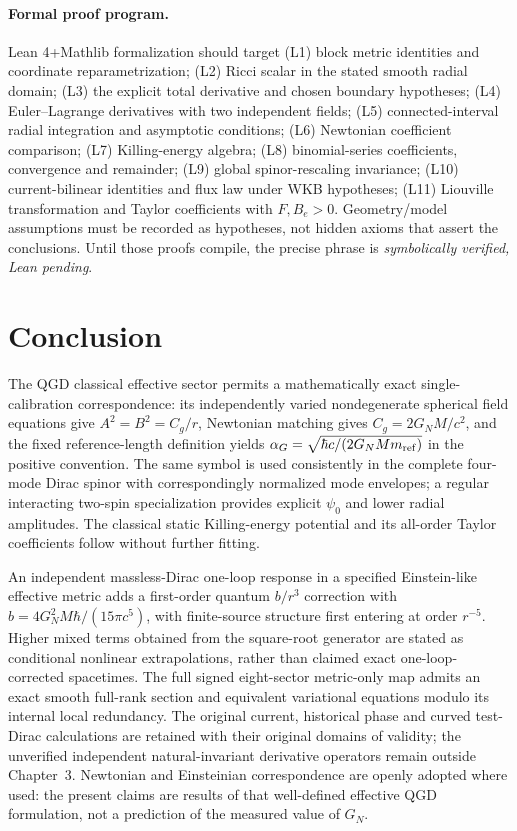 \documentclass[11pt,a4paper]{article}
\theoremstyle{remark}
\begin{document}
\paragraph{Formal proof program.}
Lean 4+Mathlib formalization should target (L1) block metric identities and coordinate reparametrization; (L2) Ricci scalar in the stated smooth radial domain; (L3) the explicit total derivative and chosen boundary hypotheses; (L4) Euler--Lagrange derivatives with two independent fields; (L5) connected-interval radial integration and asymptotic conditions; (L6) Newtonian coefficient comparison; (L7) Killing-energy algebra; (L8) binomial-series coefficients, convergence and remainder; (L9) global spinor-rescaling invariance; (L10) current-bilinear identities and flux law under WKB hypotheses; (L11) Liouville transformation and Taylor coefficients with $F,B_e>0$. Geometry/model assumptions must be recorded as hypotheses, not hidden axioms that assert the conclusions. Until those proofs compile, the precise phrase is \emph{symbolically verified, Lean pending}.

\section{Conclusion}\label{sec:conclusion}
The QGD classical effective sector permits a mathematically exact
single-calibration correspondence: its independently varied nondegenerate
spherical field equations give $A^2=B^2=C_g/r$, Newtonian matching gives
$C_g=2G_NM/c^2$, and the fixed reference-length definition yields
$\alpha_G=\sqrt{\hbar c/(2G_NMm_{\rm ref})}$ in the positive convention.
The same symbol is used consistently in the complete four-mode Dirac
spinor with correspondingly normalized mode envelopes; a regular
interacting two-spin specialization provides explicit $\psi_0$ and lower
radial amplitudes. The classical static Killing-energy potential and
its all-order Taylor coefficients follow without further fitting.

An independent massless-Dirac one-loop response in a specified Einstein-like
effective metric adds a first-order quantum $b/r^3$ correction with
$b=4G_N^2M\hbar/(15\pi c^5)$, with finite-source structure first entering
at order $r^{-5}$. Higher mixed terms obtained from the square-root
generator are stated as conditional nonlinear extrapolations, rather
than claimed exact one-loop-corrected spacetimes. The full signed eight-sector
metric-only map admits an exact smooth full-rank section and equivalent
variational equations modulo its internal local redundancy.
The original current, historical phase and curved test-Dirac calculations
are retained with their original domains of validity; the unverified
independent natural-invariant derivative operators remain outside
Chapter~3. Newtonian and Einsteinian correspondence are openly adopted
where used: the present claims are results of that well-defined
effective QGD formulation, not a prediction of the measured value of $G_N$.
\end{document}
